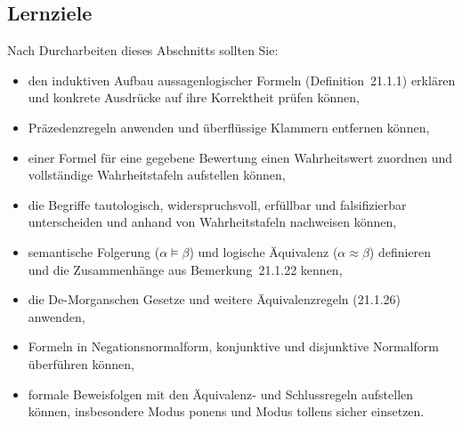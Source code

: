 \documentclass[a4paper,12pt]{article}
\begin{document}
\begin{center}
\end{center}

\subsection*{Lernziele}

Nach Durcharbeiten dieses Abschnitts sollten Sie:
\begin{itemize}
  \item den induktiven Aufbau aussagenlogischer Formeln (Definition~21.1.1)
        erklären und konkrete Ausdrücke auf ihre Korrektheit prüfen können,
  \item Präzedenzregeln anwenden und überflüssige Klammern entfernen können,
  \item einer Formel für eine gegebene Bewertung einen Wahrheitswert zuordnen
        und vollständige Wahrheitstafeln aufstellen können,
  \item die Begriffe tautologisch, widerspruchsvoll, erfüllbar und falsifizierbar
        unterscheiden und anhand von Wahrheitstafeln nachweisen können,
  \item semantische Folgerung ($\alpha \models \beta$) und logische Äquivalenz
        ($\alpha \approx \beta$) definieren und die Zusammenhänge aus Bemerkung~21.1.22
        kennen,
  \item die De-Morganschen Gesetze und weitere Äquivalenzregeln (21.1.26) anwenden,
  \item Formeln in Negationsnormalform, konjunktive und disjunktive Normalform
        überführen können,
  \item formale Beweisfolgen mit den Äquivalenz- und Schlussregeln aufstellen können,
        insbesondere Modus ponens und Modus tollens sicher einsetzen.
\end{itemize}
\end{document}
